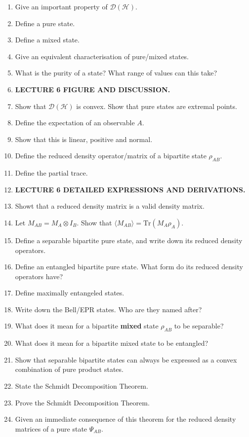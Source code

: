 \documentclass{article}
\newcommand{\mc}[1]{\mathcal{#1}}
\begin{document}
\begin{enumerate}
    \item Give an important property of $\mc{D}(\mc{H})$.
    \item Define a pure state.
    \item Define a mixed state.
    \item Give an equivalent characterisation of pure/mixed states.
    \item What is the purity of a state? What range of values can this take?
    \item \textbf{LECTURE 6 FIGURE AND DISCUSSION.}
    \item Show that $\mc{D}(\mc{H})$ is convex. Show that pure states are extremal points.
    \item Define the expectation of an observable $A$.
    \item Show that this is linear, positive and normal.
    \item Define the reduced density operator/matrix of a bipartite state $\rho_{AB}$.
    \item Define the partial trace.
    \item \textbf{LECTURE 6 DETAILED EXPRESSIONS AND DERIVATIONS.}
    \item Showt that a reduced density matrix is a valid density matrix.
    \item Let $M_{AB} = M_A\otimes I_B$. Show that $\langle M_{AB}\rangle = \textrm{Tr}(M_A\rho_A)$.
    \item Define a separable bipartite pure state, and write down its reduced density operators.
    \item Define an entangled bipartite pure state. What form do its reduced density operators have?
    \item Define maximally entangeled states.
    \item Write down the Bell/EPR states. Who are they named after?
    \item What does it mean for a bipartite \textbf{mixed} state $\rho_{AB}$ to be separable?
    \item What does it mean for a bipartite mixed state to be entangled?
    \item Show that separable bipartite states can always be expressed as a convex combination of pure product states.
    \item State the Schmidt Decomposition Theorem.
    \item Prove the Schmidt Decomposition Theorem.
    \item Given an immediate consequence of this theorem for the reduced density matrices of a pure state $\Psi_{AB}$.

\end{enumerate}
\end{document}
